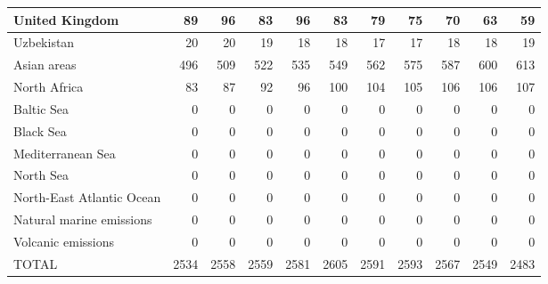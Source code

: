\begin{table}
\begin{tabular}{|l|r|r|r|r|r|r|r|r|r|r|}
                United Kingdom&     89&     96&     83&     96&     83&     79&     75&     70&     63&     59\\\hline
                    Uzbekistan&     20&     20&     19&     18&     18&     17&     17&     18&     18&     19\\\hline
                   Asian areas&    496&    509&    522&    535&    549&    562&    575&    587&    600&    613\\\hline
                  North Africa&     83&     87&     92&     96&    100&    104&    105&    106&    106&    107\\\hline
                    Baltic Sea&      0&      0&      0&      0&      0&      0&      0&      0&      0&      0\\\hline
                     Black Sea&      0&      0&      0&      0&      0&      0&      0&      0&      0&      0\\\hline
             Mediterranean Sea&      0&      0&      0&      0&      0&      0&      0&      0&      0&      0\\\hline
                     North Sea&      0&      0&      0&      0&      0&      0&      0&      0&      0&      0\\\hline
     North-East Atlantic Ocean&      0&      0&      0&      0&      0&      0&      0&      0&      0&      0\\\hline
      Natural marine emissions&      0&      0&      0&      0&      0&      0&      0&      0&      0&      0\\\hline
            Volcanic emissions&      0&      0&      0&      0&      0&      0&      0&      0&      0&      0\\\hline\hline
                         TOTAL&   2534&   2558&   2559&   2581&   2605&   2591&   2593&   2567&   2549&   2483\\\hline
 \end{tabular}
 \end{table}
 
